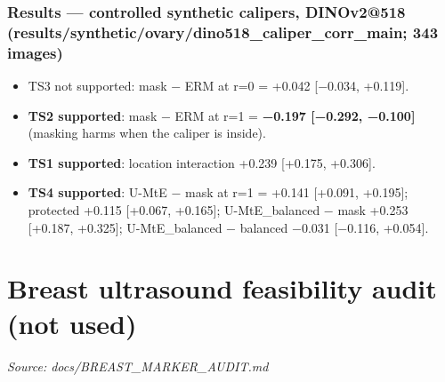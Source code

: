 {\subsubsection{Results --- controlled synthetic calipers, DINOv2@518 (results/synthetic/ovary/dino518\_caliper\_corr\_main; 343 images)}\label{results--controlled-synthetic-calipers-dinov2518-resultssyntheticovarydino518_caliper_corr_main-343-images}

\begin{itemize}

\item
  TS3 not supported: mask − ERM at r=0 = +0.042 {[}−0.034, +0.119{]}.
\item
  \textbf{TS2 supported}: mask − ERM at r=1 = \textbf{−0.197 {[}−0.292, −0.100{]}} (masking harms when the caliper is inside).
\item
  \textbf{TS1 supported}: location interaction +0.239 {[}+0.175, +0.306{]}.
\item
  \textbf{TS4 supported}: U-MtE − mask at r=1 = +0.141 {[}+0.091, +0.195{]}; protected +0.115 {[}+0.067, +0.165{]};
  U-MtE\_balanced − mask +0.253 {[}+0.187, +0.325{]}; U-MtE\_balanced − balanced −0.031 {[}−0.116, +0.054{]}.
\end{itemize}

}

\section{Breast ultrasound feasibility audit (not used)}\label{doc:BREAST_MARKER_AUDIT}
\noindent\textit{Source: docs/BREAST\_MARKER\_AUDIT.md}

